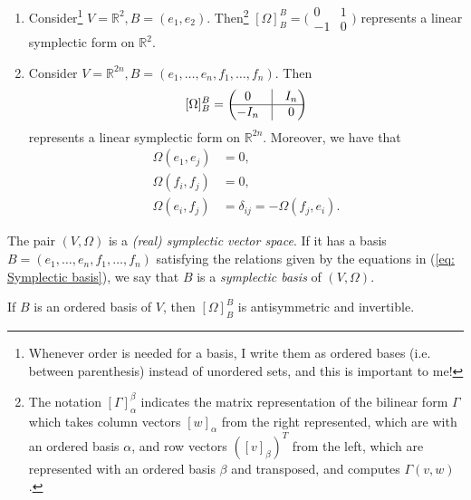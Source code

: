 \documentclass[misc]{subfiles}
\begin{document}
\begin{Exp}\leavevmode
    \begin{enumerate}[label=\ExpLbl]

        \item Consider\footnote{Whenever order is needed for a basis, I write them as ordered bases (i.e. between parenthesis) instead of unordered sets, and this is important to me!} $V=\mathbb{R}^2, B = (e_1, e_2)$. Then\footnote{The notation $[\Gamma]_\alpha^\beta$ indicates the matrix representation of the bilinear form $\Gamma$ which takes column vectors $[w]_\alpha$ from the right represented, which are with an ordered basis $\alpha$, and row vectors $([v]_\beta)^T$ from the left, which are represented with an ordered basis $\beta$ and transposed, and computes $\Gamma(v,w)$.} $[\Omega]_B^B=\big(\begin{smallmatrix} 0 &1 \\ -1 &0 \end{smallmatrix}\big)$ represents a linear symplectic form on $\mathbb{R}^2$.

        \item Consider $V=\mathbb{R}^{2n}, B = (e_1,\dots, e_n,f_1,\dots,f_n)$. Then
            \[
                [\Omega]_B^B = \begin{pmatrix} 0 &\vline &I_n \\ \hline -I_n &\vline &0\end{pmatrix}
            \]
            represents a linear symplectic form on $\mathbb{R}^{2n}$. Moreover, we have that
                \begin{align}\label{eq: Symplectic basis}
                    \Omega(e_1,e_j)&=0, \nonumber \\
                    \Omega(f_i,f_j) &= 0, \\
                    \Omega(e_i,f_j) &= \delta_{ij} = -\Omega(f_j,e_i) \nonumber.
                \end{align}
    \end{enumerate}
\end{Exp}

\begin{Dfn}\label{Dfn: Symplectic vector space}
    The pair $(V,\Omega)$ is a \emph{(real) symplectic vector space}. If it has a basis $B = (e_1,\dots, e_n,f_1,\dots,f_n)$ satisfying the relations given by the equations in (\ref{eq: Symplectic basis}), we say that $B$ is a \emph{symplectic basis} of $(V,\Omega)$.
\end{Dfn}

\begin{Rmk}\label{Rmk: Representation of symplectic forms}
    If $B$ is an ordered basis of $V$, then $[\Omega]_B^B$ is antisymmetric and invertible.
\end{Rmk}
\end{document}
